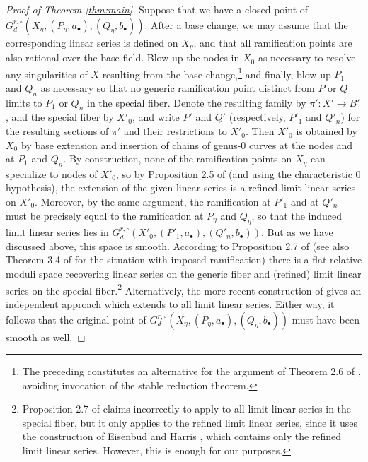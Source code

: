 \documentclass{amsart}
\begin{document}
\begin{proof}[Proof of Theorem \ref{thm:main}]
Suppose that we have a closed point of 
$G^{r,\circ}_d(X_{\eta},(P_{\eta},a_{\bullet}),(Q_{\eta},b_{\bullet}))$.
After a base change, we may assume that the corresponding linear series is defined
on $X_{\eta}$, and that all ramification points are also
rational over the base field. Blow up the nodes in $X_0$ as necessary
to resolve any singularities of $X$ resulting from the base change,\footnote{The preceding constitutes
an alternative for the argument of Theorem 2.6 of \cite{e-h1}, avoiding 
invocation of the stable reduction theorem.} and finally, blow up $P_1$ and
$Q_n$ as necessary so that no generic ramification point distinct from
$P$ or $Q$ limits to $P_1$ or $Q_n$ in the special fiber.
Denote the
resulting family by $\pi':X' \to B'$, and the special fiber by $X'_0$,
and write $P'$ and $Q'$ (respectively, $P'_1$ and $Q'_n$) for the
resulting sections of $\pi'$ and their restrictions to $X'_0$. 
Then $X'_0$ is obtained by $X_0$ by base extension and insertion of 
chains of genus-$0$ curves at the nodes and at $P_1$ and $Q_n$.
By construction, none of the ramification points on $X_\eta$ can specialize to nodes of 
$X'_0$, so by Proposition 2.5 of \cite{e-h1} (and using the characteristic
$0$ hypothesis), the extension of the given linear series is a refined limit
linear series on $X'_0$. Moreover, by the same argument, the ramification
at $P'_1$ and at $Q'_n$ must be precisely equal to the ramification at
$P_{\eta}$ and $Q_{\eta}$, so
that the induced limit linear series lies in 
$G^{r,\circ}_d(X'_0,(P'_1,a_{\bullet}),(Q'_n,b_{\bullet}))$.
But as we have discussed above, this space is smooth. According to
Proposition 2.7 of \cite{c-h-t1} (see also Theorem 3.4 of \cite{os26} 
for the situation with imposed ramification) there is a flat relative moduli 
space recovering linear series on the generic fiber and (refined) limit 
linear series on the special fiber.\footnote{Proposition 2.7 of 
\cite{c-h-t1} claims incorrectly to apply to all limit linear series in
the special fiber, but it only applies to the refined limit linear series,
since it uses the construction of Eisenbud and Harris
\cite{e-h1}, which contains only the refined limit linear series. However,
this is enough for our purposes.}
Alternatively, the more recent construction of
\cite{o-m1} gives an independent approach which extends to all limit linear
series.
Either way, it follows that the original point of 
$G^{r,\circ}_d(X_{\eta},(P_{\eta},a_{\bullet}),(Q_{\eta},b_{\bullet}))$
must have been smooth as well.


\end{proof}
\end{document}
